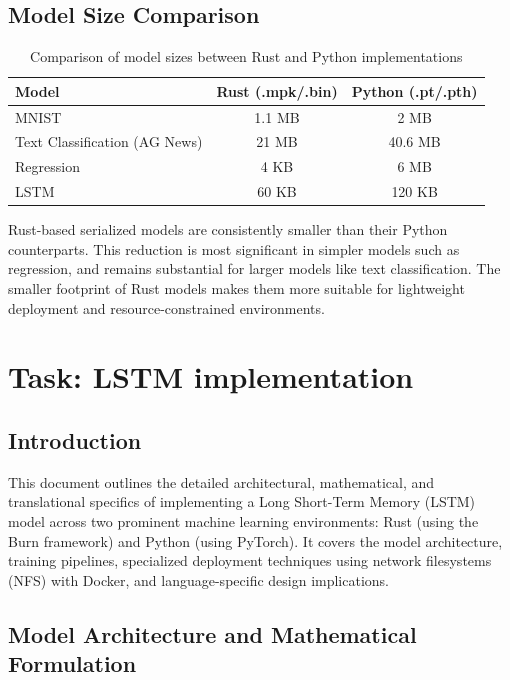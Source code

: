 \documentclass[10pt,a4paper,twocolumn]{article}
\begin{document}
\subsection{Model Size Comparison}

\begin{table}[t!]
\centering
\begin{tabular}{|l|c|c|}
\hline
\textbf{Model} & \textbf{Rust (.mpk/.bin)} & \textbf{Python (.pt/.pth)} \\
\hline
MNIST & 1.1 MB & 2 MB \\
\hline
Text Classification (AG News) & 21 MB & 40.6 MB \\
\hline
Regression & 4 KB & 6 MB \\
\hline
LSTM & 60 KB & 120 KB \\
\hline
\end{tabular}
\caption{Comparison of model sizes between Rust and Python implementations}
\end{table}

\noindent
Rust-based serialized models are consistently smaller than their Python counterparts. This reduction is most significant in simpler models such as regression, and remains substantial for larger models like text classification. The smaller footprint of Rust models makes them more suitable for lightweight deployment and resource-constrained environments.

\clearpage

\section{Task: LSTM implementation}
\newpage

\subsection{Introduction}
This document outlines the detailed architectural, mathematical, and translational specifics of implementing a Long Short-Term Memory (LSTM) model across two prominent machine learning environments: Rust (using the Burn framework) and Python (using PyTorch). It covers the model architecture, training pipelines, specialized deployment techniques using network filesystems (NFS) with Docker, and language-specific design implications.

\subsection{Model Architecture and Mathematical Formulation}
\end{document}

